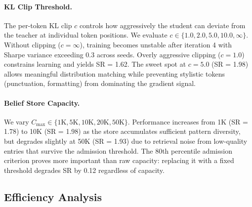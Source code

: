 \paragraph{KL Clip Threshold.} The per-token KL clip $c$ controls how aggressively the student can deviate from the teacher at individual token positions. We evaluate $c \in \{1.0, 2.0, 5.0, 10.0, \infty\}$. Without clipping ($c{=}\infty$), training becomes unstable after iteration 4 with Sharpe variance exceeding 0.3 across seeds. Overly aggressive clipping ($c{=}1.0$) constrains learning and yields SR = 1.62. The sweet spot at $c{=}5.0$ (SR = 1.98) allows meaningful distribution matching while preventing stylistic tokens (punctuation, formatting) from dominating the gradient signal.

\paragraph{Belief Store Capacity.} We vary $C_{\max} \in \{1\text{K}, 5\text{K}, 10\text{K}, 20\text{K}, 50\text{K}\}$. Performance increases from 1K (SR = 1.78) to 10K (SR = 1.98) as the store accumulates sufficient pattern diversity, but degrades slightly at 50K (SR = 1.93) due to retrieval noise from low-quality entries that survive the admission threshold. The 80th percentile admission criterion proves more important than raw capacity: replacing it with a fixed threshold degrades SR by 0.12 regardless of capacity.

\subsection{Efficiency Analysis}



